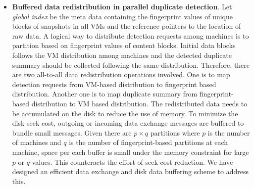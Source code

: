 \begin{itemize}
\item {\bf Buffered data redistribution in parallel duplicate detection}.  
Let {\em global index} be the meta data containing the fingerprint values of unique blocks of snapshots
in all VMs and  the reference pointers to the location of raw data.
A logical way to distribute detection requests among machines is to partition based on 
fingerprint values of content blocks.
Initial data  blocks follows the VM distribution among machines and the detected duplicate summary 
should be collected following the same distribution.
Therefore, there are two all-to-all data redistribution operations involved.
One is to map detection requests from VM-based distribution to fingerprint based distribution.  
Another one  is to map duplicate summary from fingerprint-based distribution to VM based distribution.  
The redistributed data needs to be accumulated on the disk to reduce the use of memory.
To minimize the disk seek cost, outgoing or incoming data exchange messages are buffered to 
bundle small messages.
Given there are $p\times q$ partitions where $p$ is the number of machines and $q$ is the number of fingerprint-based partitions
at each machine, space per each buffer  is small under the memory constraint for large $p$ or $q$ values.
This counteracts the effort of seek cost reduction.  
We have designed an efficient data exchange and disk data buffering  scheme to address this.


\end{itemize}


